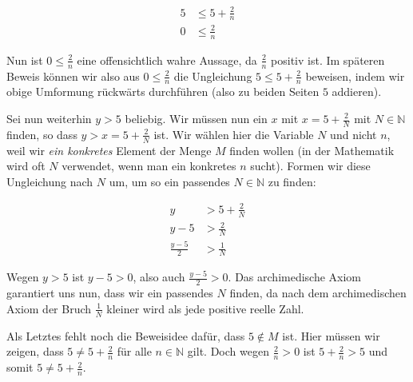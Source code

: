 \documentclass[fontsize=9pt,
               parskip=half-,
               DIV=14,
               listof=chapterentry,
               tocflat]{scrbook}
\newenvironment{indentblock}{\begin{adjustwidth}{.5cm}{}}{\end{adjustwidth}}
\begin{document}
\begin{solutionprocess*}
\begin{indentblock}
\begin{align*}
5&\leq 5+{\tfrac {2}{n}}\\0&\leq {\tfrac {2}{n}}
\end{align*}

Nun ist $0\leq {\tfrac {2}{n}}$ eine offensichtlich wahre Aussage, da ${\tfrac {2}{n}}$ positiv ist. Im späteren Beweis können wir also aus $0\leq {\tfrac {2}{n}}$ die Ungleichung $5\leq 5+{\tfrac {2}{n}}$ beweisen, indem wir obige Umformung rückwärts durchführen (also zu beiden Seiten $5$ addieren).

Sei nun weiterhin $y>5$ beliebig. Wir müssen nun ein $x$ mit $x=5+{\tfrac {2}{N}}$ mit $N\in \mathbb {N} $ finden, so dass $y>x=5+{\tfrac {2}{N}}$ ist. Wir wählen hier die Variable $N$ und nicht $n$, weil wir \emph{ein konkretes} Element der Menge $M$ finden wollen (in der Mathematik wird oft $N$ verwendet, wenn man ein konkretes $n$ sucht). Formen wir diese Ungleichung nach $N$ um, um so ein passendes $N\in \mathbb {N} $ zu finden:

\begin{align*}
y&>5+{\tfrac {2}{N}}\\y-5&>{\tfrac {2}{N}}\\{\tfrac {y-5}{2}}&>{\tfrac {1}{N}}
\end{align*}

Wegen $y>5$ ist $y-5>0$, also auch ${\tfrac {y-5}{2}}>0$. Das archimedische Axiom garantiert uns nun, dass wir ein passendes $N$ finden, da nach dem archimedischen Axiom der Bruch ${\tfrac {1}{N}}$ kleiner wird als jede positive reelle Zahl.

Als Letztes fehlt noch die Beweisidee dafür, dass $5\notin M$ ist. Hier müssen wir zeigen, dass $5\neq 5+{\tfrac {2}{n}}$ für alle $n\in \mathbb {N} $ gilt. Doch wegen ${\tfrac {2}{n}}>0$ ist $5+{\tfrac {2}{n}}>5$ und somit $5\neq 5+{\tfrac {2}{n}}$.

\end{indentblock}

\end{solutionprocess*}
\end{document}
